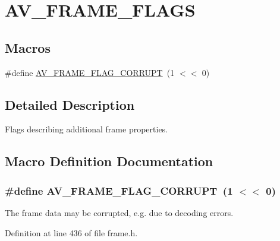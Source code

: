 \hypertarget{group__lavu__frame__flags}{}\section{A\+V\+\_\+\+F\+R\+A\+M\+E\+\_\+\+F\+L\+A\+GS}
\label{group__lavu__frame__flags}
\subsection*{Macros}
\begin{DoxyCompactItemize}
\item 
\#define \hyperlink{group__lavu__frame__flags_gadddbce4ec0cc2ad4298cf6f266f97f6a}{A\+V\+\_\+\+F\+R\+A\+M\+E\+\_\+\+F\+L\+A\+G\+\_\+\+C\+O\+R\+R\+U\+PT}~(1 $<$$<$ 0)
\end{DoxyCompactItemize}


\subsection{Detailed Description}
Flags describing additional frame properties. 

\subsection{Macro Definition Documentation}
\subsubsection[{\texorpdfstring{A\+V\+\_\+\+F\+R\+A\+M\+E\+\_\+\+F\+L\+A\+G\+\_\+\+C\+O\+R\+R\+U\+PT}{AV_FRAME_FLAG_CORRUPT}}]{\setlength{\rightskip}{0pt plus 5cm}\#define A\+V\+\_\+\+F\+R\+A\+M\+E\+\_\+\+F\+L\+A\+G\+\_\+\+C\+O\+R\+R\+U\+PT~(1 $<$$<$ 0)}\hypertarget{group__lavu__frame__flags_gadddbce4ec0cc2ad4298cf6f266f97f6a}{}\label{group__lavu__frame__flags_gadddbce4ec0cc2ad4298cf6f266f97f6a}
The frame data may be corrupted, e.\+g. due to decoding errors. 

Definition at line 436 of file frame.\+h.

